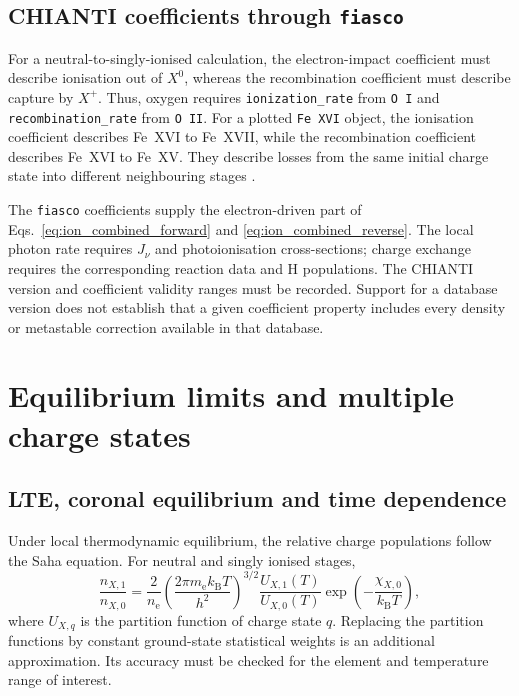 \documentclass[a4paper,10pt,twoside,openany]{book}
\newcommand{\ChapColor}{Cap1Blue}
\newcommand{\ChapColorLight}{LightBlue}
\newcommand{\setChapColor}[2]{%
  \renewcommand{\ChapColor}{#1}%
  \renewcommand{\ChapColorLight}{#2}}
\newenvironment{example}[1]{%
  \begin{tcolorbox}[notebox,colback=BoxGray,colframe=RuleGray,
    colbacktitle=MidGray,coltitle=white,
    title={Example: #1}]}{\end{tcolorbox}}
\begin{document}
\section{CHIANTI coefficients through \texttt{fiasco}}
\label{subsec:ion_fiasco}

\begin{example}{Choosing the adjacent ion stages in fiasco}
For a neutral-to-singly-ionised calculation, the electron-impact coefficient
must describe ionisation out of \(X^0\), whereas the recombination coefficient
must describe capture by \(X^+\). Thus, oxygen requires
\texttt{ionization\_rate} from \texttt{O I} and
\texttt{recombination\_rate} from \texttt{O II}.
For a plotted \texttt{Fe XVI} object, the ionisation coefficient describes
Fe~XVI to Fe~XVII, while the recombination coefficient describes Fe~XVI to
Fe~XV. They describe losses from the same initial charge state into different
neighbouring stages \cite{fiasco_rates}.
\end{example}

The \texttt{fiasco} coefficients supply the electron-driven part of
Eqs.~\eqref{eq:ion_combined_forward} and \eqref{eq:ion_combined_reverse}.
The local photon rate requires \(J_\nu\) and photoionisation cross-sections;
charge exchange requires the corresponding reaction data and H populations.
The CHIANTI version and coefficient validity ranges must be recorded.
Support for a database version does not establish that a given coefficient
property includes every density or metastable correction available in that
database.

\setChapColor{Cap4Purple}{LightPurple}
\chapter{Equilibrium limits and multiple charge states}

\section{LTE, coronal equilibrium and time dependence}
\label{subsec:ion_equilibrium_limits}

Under local thermodynamic equilibrium, the relative charge populations follow
the Saha equation. For neutral and singly ionised stages,
\begin{equation}
 \frac{n_{X,1}}{n_{X,0}}
 =\frac{2}{n_{\mathrm e}}
 \left(\frac{2\pi m_{\mathrm e}k_{\mathrm B}T}{h^2}\right)^{3/2}
 \frac{U_{X,1}(T)}{U_{X,0}(T)}
 \exp\left(-\frac{\chi_{X,0}}{k_{\mathrm B}T}\right),
 \label{eq:ion_saha}
\end{equation}
where \(U_{X,q}\) is the partition function of charge state \(q\).
Replacing the partition functions by constant ground-state statistical weights
is an additional approximation. Its accuracy must be checked for the element
and temperature range of interest.
\end{document}

